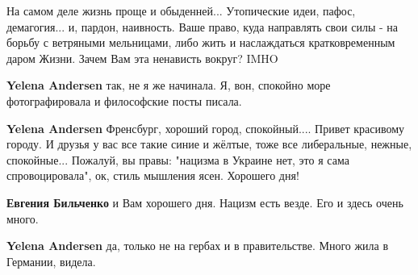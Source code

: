 \begin{itemize}
На самом деле жизнь проще и обыденней... Утопические идеи, пафос, демагогия...
и, пардон, наивность. Ваше право, куда направлять свои силы - на борьбу с
ветряными мельницами, либо жить и наслаждаться кратковременным даром Жизни.
Зачем Вам эта ненависть вокруг? IMHO

\begin{itemize}
 
\textbf{Yelena Andersen} так, не я же начинала. Я, вон, спокойно море фотографировала и философские посты писала.

 
\textbf{Yelena Andersen} Френсбург, хороший город, спокойный.... Привет красивому городу. И друзья у вас все такие синие и жёлтые, тоже все либеральные, нежные, спокойные... Пожалуй, вы правы: "нацизма в Украине нет, это я сама спровоцировала", ок, стиль мышления ясен. Хорошего дня!

 
\textbf{Евгения Бильченко} и Вам хорошего дня. Нацизм есть везде. Его и здесь очень много.

 
\textbf{Yelena Andersen} да, только не на гербах и в правительстве. Много жила в Германии, видела.

 

\end{itemize}
\end{itemize}
